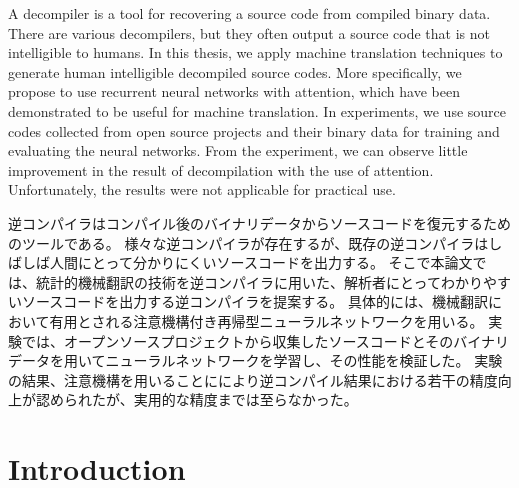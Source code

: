 \documentclass[senior,final,11pt]{iscs-thesis}
\date{December 11, 2018}
\begin{document}
\begin{eabstract}
A decompiler is a tool for recovering a source code from compiled binary data.
There are various decompilers, but they often output a source code that is not intelligible to humans. 
In this thesis, we apply machine translation techniques to generate human intelligible decompiled source codes. 
More specifically, we propose to use recurrent neural networks with attention, 
which have been demonstrated to be useful for machine translation. 
In experiments, we use source codes collected from open source projects and their binary data for training and evaluating the neural networks.
From the experiment, we can observe little improvement in the result of decompilation with the use of attention.
Unfortunately, the results were not applicable for practical use.

\end{eabstract}
\begin{jabstract}
逆コンパイラはコンパイル後のバイナリデータからソースコードを復元するためのツールである。
様々な逆コンパイラが存在するが、既存の逆コンパイラはしばしば人間にとって分かりにくいソースコードを出力する。
そこで本論文では、統計的機械翻訳の技術を逆コンパイラに用いた、解析者にとってわかりやすいソースコードを出力する逆コンパイラを提案する。
具体的には、機械翻訳において有用とされる注意機構付き再帰型ニューラルネットワークを用いる。
実験では、オープンソースプロジェクトから収集したソースコードとそのバイナリデータを用いてニューラルネットワークを学習し、その性能を検証した。
実験の結果、注意機構を用いることににより逆コンパイル結果における若干の精度向上が認められたが、実用的な精度までは至らなかった。
\end{jabstract}

\maketitle

\chapter{Introduction}
\end{document}
